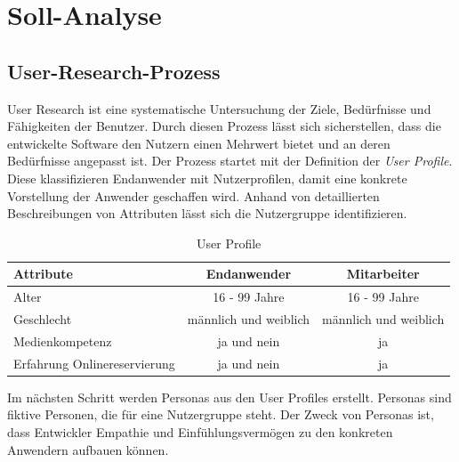 	\section{Soll-Analyse}
		
	 	\subsection{User-Research-Prozess} 
	 	User Research ist eine systematische Untersuchung der Ziele, Bedürfnisse und Fähigkeiten der Benutzer\autocite[Vgl.][S. 6]{Schumacher.2010}.
	 	Durch diesen Prozess lässt sich sicherstellen, dass die entwickelte Software den Nutzern einen Mehrwert bietet und an deren Bedürfnisse angepasst ist.
		Der Prozess startet mit der Definition der \textit{User Profile}. Diese klassifizieren Endanwender mit Nutzerprofilen, damit eine konkrete Vorstellung der Anwender geschaffen wird. Anhand von detaillierten Beschreibungen von Attributen lässt sich die Nutzergruppe identifizieren.
		
		\begin{table}[H]
			\centering
			\begin{tabular}{p{} || c | c }
				\textbf{Attribute} & \textbf{Endanwender} & \textbf{Mitarbeiter} \\\toprule
				Alter &  16 - 99 Jahre &  16 - 99 Jahre \\
				Geschlecht &  männlich und weiblich &  männlich und weiblich  \\
				Medienkompetenz &  ja und nein &  ja  \\
				Erfahrung Onlinereservierung &  ja und nein &  ja  \\
			\end{tabular}
			\caption[User Profile]{\label{tab:tabelleUserProfile}User Profile}
		\end{table}
		
		Im nächsten Schritt werden Personas aus den User Profiles erstellt. Personas sind fiktive Personen, die für eine Nutzergruppe steht. Der Zweck von Personas ist, dass Entwickler Empathie und Einfühlungsvermögen zu den konkreten Anwendern aufbauen können. 
		

